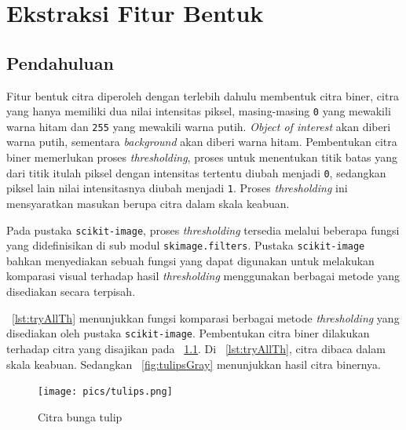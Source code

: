 \chapter{Ekstraksi Fitur Bentuk}
\section{Pendahuluan}
\label{sec:citrabiner}
Fitur bentuk citra diperoleh dengan terlebih dahulu membentuk citra biner, citra yang hanya memiliki dua nilai intensitas piksel, masing-masing \texttt{0} yang mewakili warna hitam dan \texttt{255} yang mewakili warna putih. \textit{Object of interest} akan diberi warna putih, sementara \textit{background} akan diberi warna hitam. Pembentukan citra biner memerlukan proses \textit{thresholding}, proses untuk menentukan titik batas yang dari titik itulah piksel dengan intensitas tertentu diubah menjadi \texttt{0}, sedangkan piksel lain nilai intensitasnya diubah menjadi \texttt{1}. Proses \textit{thresholding} ini mensyaratkan masukan berupa citra dalam skala keabuan.

Pada pustaka \texttt{scikit-image}, proses \textit{thresholding} tersedia melalui beberapa fungsi yang didefinisikan di sub modul \texttt{skimage.filters}. Pustaka \texttt{scikit-image} bahkan menyediakan sebuah fungsi yang dapat digunakan untuk melakukan komparasi visual terhadap hasil \textit{thresholding} menggunakan berbagai metode yang disediakan secara terpisah.

\lstlistingname~\ref{lst:tryAllTh} menunjukkan fungsi komparasi berbagai metode \textit{thresholding} yang disediakan oleh pustaka \texttt{scikit-image}. Pembentukan citra biner dilakukan terhadap citra yang disajikan pada \figurename~\ref{fig:tulips}. Di \lstlistingname~\ref{lst:tryAllTh}, citra dibaca dalam skala keabuan. Sedangkan \figurename~\ref{fig:tulipsGray} menunjukkan hasil citra binernya.

\scriptsize

\normalsize

\begin{figure}
  \begin{center}
    \texttt{[image: pics/tulips.png]}
    \caption{Citra bunga tulip}
    \label{fig:tulips}
  \end{center}
\end{figure}

